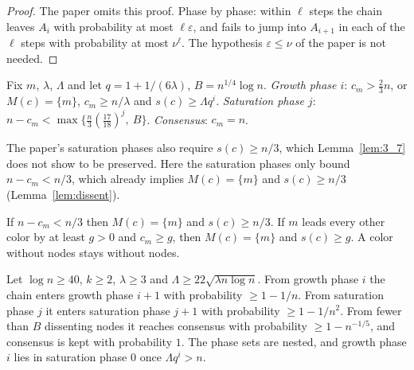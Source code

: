 \begin{proof}
  The paper omits this proof. Phase by phase: within $\ell$ steps the chain
  leaves $A_i$ with probability at most $\ell\varepsilon$, and fails to jump
  into $A_{i+1}$ in each of the $\ell$ steps with probability at most
  $\nu^\ell$. The hypothesis $\varepsilon \le \nu$ of the paper is not needed.
\end{proof}

\begin{definition}\label{def:phases}
  \leanok
  Fix $m$, $\lambda$, $\Lambda$ and let $q = 1 + 1/(6\lambda)$,
  $B = n^{1/4}\log n$.
  \emph{Growth phase $i$}: $c_m > \frac23 n$, or $M(c) = \{m\}$,
  $c_m \ge n/\lambda$ and $s(c) \ge \Lambda q^i$.
  \emph{Saturation phase $j$}:
  $n - c_m < \max\{\frac n3 (\frac{17}{18})^j,\ B\}$.
  \emph{Consensus}: $c_m = n$.
\end{definition}

\begin{remark}
  The paper's saturation phases also require $s(c) \ge n/3$, which
  Lemma~\ref{lem:3_7} does not show to be preserved. Here the saturation
  phases only bound $n - c_m < n/3$, which already implies $M(c) = \{m\}$
  and $s(c) \ge n/3$ (Lemma~\ref{lem:dissent}).
\end{remark}

\begin{lemma}\label{lem:dissent}
  \leanok
  If $n - c_m < n/3$ then $M(c) = \{m\}$ and $s(c) \ge n/3$. If $m$ leads
  every other color by at least $g > 0$ and $c_m \ge g$, then $M(c) = \{m\}$
  and $s(c) \ge g$. A color without nodes stays without nodes.
\end{lemma}

\begin{lemma}\label{lem:phase_steps}
  \leanok
  Let $\log n \ge 40$, $k \ge 2$, $\lambda \ge 3$ and
  $\Lambda \ge 22\sqrt{\lambda n \log n}$.
  From growth phase $i$ the chain enters growth phase $i+1$ with probability
  $\ge 1 - 1/n$. From saturation phase $j$ it enters saturation phase $j+1$
  with probability $\ge 1 - 1/n^2$. From fewer than $B$ dissenting nodes it
  reaches consensus with probability $\ge 1 - n^{-1/5}$, and consensus is
  kept with probability $1$. The phase sets are nested, and growth phase $i$
  lies in saturation phase $0$ once $\Lambda q^i > n$.
\end{lemma}

